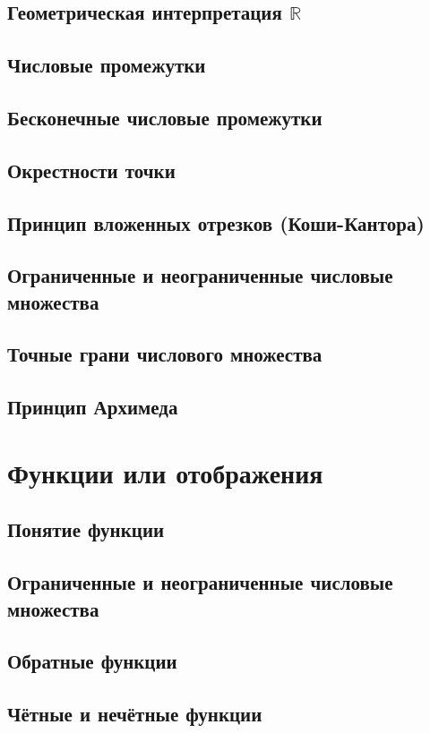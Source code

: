 \documentclass[a4paper,12pt]{article} %
\begin{document}
\subsection{Геометрическая интерпретация $\mathbb{R}$}
\subsection{Числовые промежутки}
\subsection{Бесконечные числовые промежутки}
\subsection{Окрестности точки}
\subsection{Принцип вложенных отрезков (Коши-Кантора)}
\subsection{Ограниченные и неограниченные числовые множества}
\subsection{Точные грани числового множества}
\subsection{Принцип Архимеда}


\section{Функции или отображения}
\subsection{Понятие функции}
\subsection{Ограниченные и неограниченные числовые множества}
\subsection{Обратные функции}
\subsection{Чётные и нечётные функции}
\end{document}

